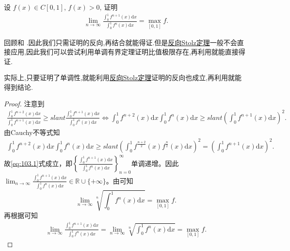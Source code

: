 \documentclass[../../main.tex]{subfiles}
\begin{document}
\begin{example}
设 $f(x) \in C[0,1]$, $f(x) > 0$, 证明
\begin{align*}
\lim_{n \to \infty} \frac{\int_0^1 f^{n+1}(x) \mathrm{d}x}{\int_0^1 f^n(x) \mathrm{d}x} = \max_{[0,1]} f.
\end{align*}
\end{example}
\begin{note}
回顾和
.因此我们只需证明的反向,再结合就能得证.但是\hyperref[theorem:反向Stolz定理]{反向Stolz定理}一般不会直接应用,因此我们可以尝试利用单调有界定理证明比值极限存在,再利用就能直接得证.

实际上,只要证明了单调性,就能利用\hyperref[theorem:反向Stolz定理]{反向Stolz定理}证明的反向也成立,再利用就能得到结论.
\end{note}
\begin{proof}
注意到
\begin{align}
\frac{\int_0^1 f^{n+2}(x) \mathrm{d}x}{\int_0^1 f^{n+1}(x) \mathrm{d}x} \geqslant slant \frac{\int_0^1 f^{n+1}(x) \mathrm{d}x}{\int_0^1 f^n(x) \mathrm{d}x} \Longleftrightarrow \int_0^1 f^{n+2}(x) \mathrm{d}x \int_0^1 f^n(x) \mathrm{d}x \geqslant slant \left( \int_0^1 f^{n+1}(x) \mathrm{d}x \right)^2.\label{eq:103.1}
\end{align}
由Cauchy不等式知
\begin{align*}
\int_0^1 f^{n+2}(x) \mathrm{d}x \int_0^1 f^n(x) \mathrm{d}x \geqslant slant \left( \int_0^1 f^{\frac{n+2}{2}}(x) f^{\frac{n}{2}}(x) \mathrm{d}x \right)^2 = \left( \int_0^1 f^{n+1}(x) \mathrm{d}x \right)^2.
\end{align*}
故\eqref{eq:103.1}式成立，即$\left\{ \frac{\int_0^1 f^{n+1}(x) \mathrm{d}x}{\int_0^1 f^n(x) \mathrm{d}x} \right\}_{n=0}^{\infty}$单调递增。因此$\lim_{n \to \infty} \frac{\int_0^1 f^{n+1}(x) \mathrm{d}x}{\int_0^1 f^n(x) \mathrm{d}x} \in \mathbb{R} \cup \{ +\infty \}$。由可知$$\lim_{n \to \infty} \sqrt[n]{\int_0^1 f^n(x) \mathrm{d}x} = \max_{[0,1]} f.$$再根据可知
\begin{align*}
\lim_{n \to \infty} \frac{\int_0^1 f^{n+1}(x) \mathrm{d}x}{\int_0^1 f^n(x) \mathrm{d}x} = \lim_{n \to \infty} \sqrt[n]{\int_0^1 f^n(x) \mathrm{d}x} = \max_{[0,1]} f.
\end{align*}
\end{proof}
\end{document}

